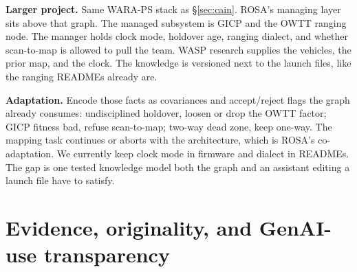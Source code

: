 \documentclass[11pt,a4paper,twocolumn]{amsart}
\begin{document}
\textbf{Larger project.} Same WARA-PS stack as \S\ref{sec:cain}. ROSA's managing layer sits above that graph. The managed subsystem is GICP and the OWTT ranging node. The manager holds clock mode, holdover age, ranging dialect, and whether scan-to-map is allowed to pull the team. WASP research supplies the vehicles, the prior map, and the clock. The knowledge is versioned next to the launch files, like the ranging READMEs already are.

\textbf{Adaptation.} Encode those facts as covariances and accept/reject flags the graph already consumes: undisciplined holdover, loosen or drop the OWTT factor; GICP fitness bad, refuse scan-to-map; two-way dead zone, keep one-way. The mapping task continues or aborts with the architecture, which is ROSA's co-adaptation. We currently keep clock mode in firmware and dialect in READMEs. The gap is one tested knowledge model both the graph and an assistant editing a launch file have to satisfy.

\section{Evidence, originality, and GenAI-use transparency}
\label{sec:evidence}
\end{document}
